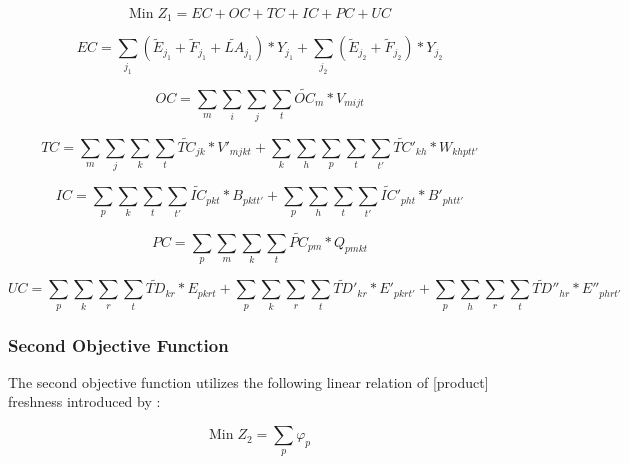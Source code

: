 \documentclass[10pt,twocolumn]{article}
\begin{document}
\begin{equation}
\text{Min}\; Z_1 = EC + OC + TC + IC + PC + UC
\label{eq:z1}
\end{equation}

\begin{equation}
EC = \sum_{j_1}\left(\tilde{E}_{j_1} + \tilde{F}_{j_1}
     + \tilde{LA}_{j_1}\right) * Y_{j_1}
     + \sum_{j_2}\left(\tilde{E}_{j_2} + \tilde{F}_{j_2}\right)
     * Y_{j_2}
\label{eq:ec}
\end{equation}

\begin{equation}
OC = \sum_{m}\sum_{i}\sum_{j}\sum_{t}
     \widetilde{OC}_m * V_{mijt}
\label{eq:oc}
\end{equation}

\begin{equation}
TC = \sum_{m}\sum_{j}\sum_{k}\sum_{t}
     \widetilde{TC}_{jk} * V'_{mjkt}
   + \sum_{k}\sum_{h}\sum_{p}\sum_{t}\sum_{t'}
     \widetilde{TC}'_{kh} * W_{khptt'}
\label{eq:tc}
\end{equation}

\begin{equation}
IC = \sum_{p}\sum_{k}\sum_{t}\sum_{t'}
     \widetilde{IC}_{pkt} * B_{pktt'}
   + \sum_{p}\sum_{h}\sum_{t}\sum_{t'}
     \widetilde{IC}'_{pht} * B'_{phtt'}
\label{eq:ic}
\end{equation}

\begin{equation}
PC = \sum_{p}\sum_{m}\sum_{k}\sum_{t}
     \widetilde{PC}_{pm} * Q_{pmkt}
\label{eq:pc}
\end{equation}

\begin{equation}
UC = \sum_{p}\sum_{k}\sum_{r}\sum_{t}
     \widetilde{TD}_{kr} * E_{pkrt}
   + \sum_{p}\sum_{k}\sum_{r}\sum_{t}
     \widetilde{TD}'_{kr} * E'_{pkrt'}
   + \sum_{p}\sum_{h}\sum_{r}\sum_{t}
     \widetilde{TD}''_{hr} * E''_{phrt'}
\label{eq:uc}
\end{equation}

\subsubsection{Second Objective Function}
The second objective function utilizes the following linear relation
of [product] freshness introduced by \citet{Osvald2008}:

\begin{equation}
\text{Min}\; Z_2 = \sum_p \varphi_p
\label{eq:z2}
\end{equation}
\end{document}
